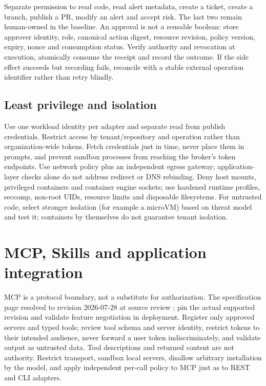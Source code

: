 \documentclass[11pt,letterpaper]{article}
\begin{document}
Separate permission to read code, read alert metadata, create a ticket, create a branch, publish a PR, modify an alert and accept risk. The last two remain human-owned in the baseline. An approval is not a reusable boolean: store approver identity, role, canonical action digest, resource revision, policy version, expiry, nonce and consumption status. Verify authority and revocation at execution, atomically consume the receipt and record the outcome. If the side effect succeeds but recording fails, reconcile with a stable external operation identifier rather than retry blindly.

\subsection{Least privilege and isolation}
Use one workload identity per adapter and separate read from publish credentials. Restrict access by tenant/repository and operation rather than organization-wide tokens. Fetch credentials just in time, never place them in prompts, and prevent sandbox processes from reaching the broker's token endpoints. Use network policy plus an independent egress gateway; application-layer checks alone do not address redirect or DNS rebinding. Deny host mounts, privileged containers and container engine sockets; use hardened runtime profiles, seccomp, non-root UIDs, resource limits and disposable filesystems. For untrusted code, select stronger isolation (for example a microVM) based on threat model and test it; containers by themselves do not guarantee tenant isolation.

\section{MCP, Skills and application integration}
MCP is a protocol boundary, not a substitute for authorization. The specification page resolved to revision 2026-07-28 at source review \cite{mcp}; pin the actual supported revision and validate feature negotiation in deployment. Register only approved servers and typed tools; review tool schema and server identity, restrict tokens to their intended audience, never forward a user token indiscriminately, and validate output as untrusted data. Tool descriptions and returned content are not authority. Restrict transport, sandbox local servers, disallow arbitrary installation by the model, and apply independent per-call policy to MCP just as to REST and CLI adapters.
\end{document}
